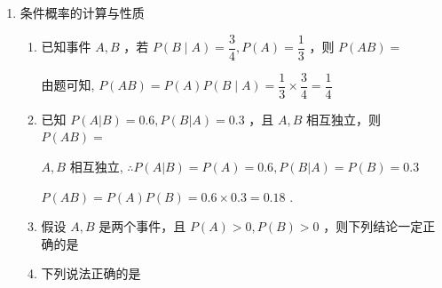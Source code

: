 \begin{enumerate}
\begin{enumerate}
\begin{jieda}
\begin{enumerate}
                所以在 $\left\lbrack  {{80},{100}}\right\rbrack$ 内的样本得分的平均数 $\bar{x} = \dfrac{2}{3} \times  {86} + \dfrac{1}{3} \times  {92} = {88}$ 分,
                
                方差 ${s}^{2} = \dfrac{2}{3}\left\lbrack  {{10} + {\left( {88} - {86}\right) }^{2}}\right\rbrack   + \dfrac{1}{3}\left\lbrack  {6 + {\left( {88} - {92}\right) }^{2}}\right\rbrack   = \dfrac{50}{3}$
            \end{enumerate}
        \end{jieda}
    \end{enumerate}
    \item 条件概率的计算与性质
    \begin{enumerate}
        \item 已知事件 $A,B$ ，若 $P\left( {B \mid  A}\right)  = \dfrac{3}{4},P\left( A\right)  = \dfrac{1}{3}$ ，则 $P\left( {AB}\right)  =$ 
        \begin{jieda}
            由题可知, $P\left( {AB}\right)  = P\left( A\right) P\left( {B \mid  A}\right)  = \dfrac{1}{3} \times  \dfrac{3}{4} = \dfrac{1}{4}$
        \end{jieda}
        
        \item 已知 $P\left( {A|B}\right)  = {0.6},P\left( {B|A}\right)  = {0.3}$ ，且 $A,B$ 相互独立，则 $P\left( {AB}\right)  =$ 
        \begin{jieda}
            $A,B$ 相互独立, $\therefore P\left( {A|B}\right)  = P\left( A\right)  = {0.6},P\left( {B|A}\right)  = P\left( B\right)  = {0.3}$
            
            $P\left( {AB}\right)  = P\left( A\right) P\left( B\right)  = {0.6} \times  {0.3} = {0.18}$ .
        \end{jieda}

        \item 假设 $A,B$ 是两个事件，且 $P\left( A\right)  > 0,P\left( B\right)  > 0$ ，则下列结论一定正确的是

        \item 下列说法正确的是


\end{enumerate}
\end{enumerate}
